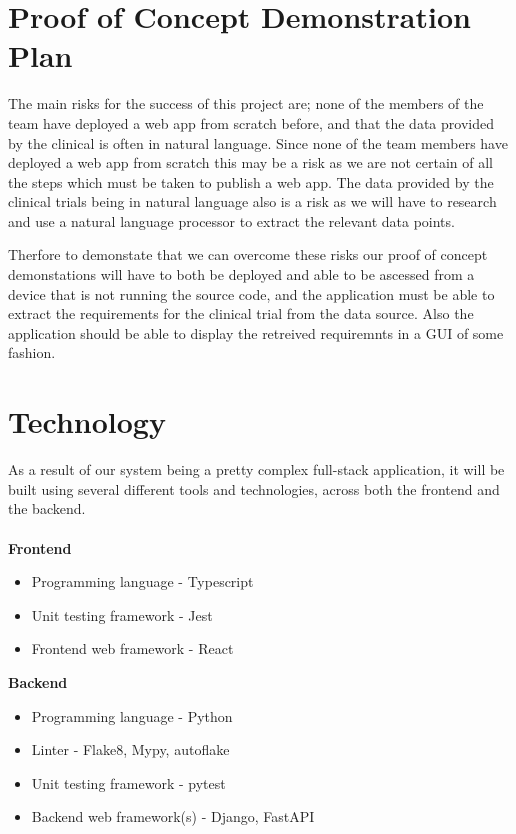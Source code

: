 \documentclass{article}
\begin{document}
\section{Proof of Concept Demonstration Plan}

The main risks for the success of this project are; none of the members of the team have deployed a web app from scratch before, and that the data provided by the clinical is often in natural language. Since none of the team members have deployed a web app from scratch this may be a risk as we are not certain of all the steps which must be taken to publish a web app. The data provided by the clinical trials being in natural language also is a risk as we will have to research and use a natural language processor to extract the relevant data points. 

Therfore to demonstate that we can overcome these risks our proof of concept demonstations will have to both be deployed and able to be ascessed from a device that is not running the source code, and the application must be able to extract the requirements for the clinical trial from the data source. Also the application should be able to display the retreived requiremnts in a GUI of some fashion.

\section{Technology}

As a result of our system being a pretty complex full-stack application, it will be built
using several different tools and technologies, across both the frontend and the backend.
\\~\\
\textbf{Frontend}

\begin{itemize}
	\item Programming language - Typescript
	\item Unit testing framework - Jest
	\item Frontend web framework - React\\
\end{itemize}

\textbf{Backend}

\begin{itemize}
	\item Programming language - Python
	\item Linter - Flake8, Mypy, autoflake
	\item Unit testing framework - pytest
	\item Backend web framework(s) - Django, FastAPI\\
\end{itemize}
\end{document}
